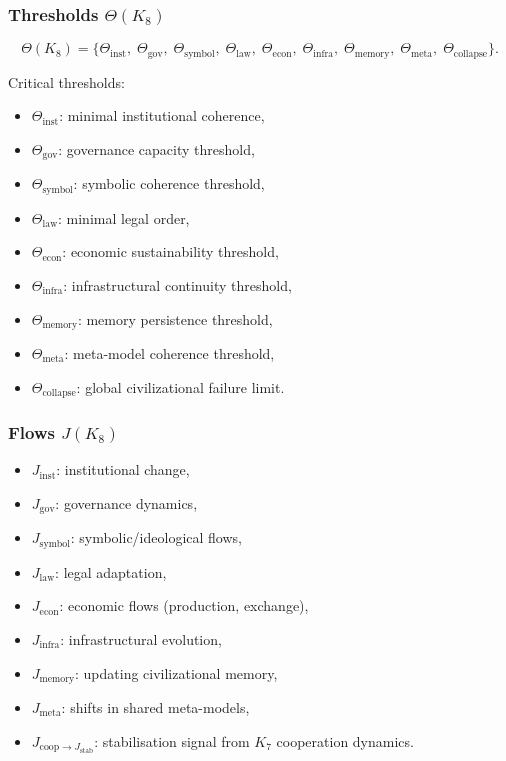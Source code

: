 \subsubsection{Thresholds \texorpdfstring{$\Theta(K_8)$}{\Theta(K_8)}}

\[
\Theta(K_8)=
\{
\Theta_{\mathrm{inst}},\;
\Theta_{\mathrm{gov}},\;
\Theta_{\mathrm{symbol}},\;
\Theta_{\mathrm{law}},\;
\Theta_{\mathrm{econ}},\;
\Theta_{\mathrm{infra}},\;
\Theta_{\mathrm{memory}},\;
\Theta_{\mathrm{meta}},\;
\Theta_{\mathrm{collapse}}
\}.
\]

Critical thresholds:
\begin{itemize}
    \item $\Theta_{\mathrm{inst}}$: minimal institutional coherence,
    \item $\Theta_{\mathrm{gov}}$: governance capacity threshold,
    \item $\Theta_{\mathrm{symbol}}$: symbolic coherence threshold,
    \item $\Theta_{\mathrm{law}}$: minimal legal order,
    \item $\Theta_{\mathrm{econ}}$: economic sustainability threshold,
    \item $\Theta_{\mathrm{infra}}$: infrastructural continuity threshold,
    \item $\Theta_{\mathrm{memory}}$: memory persistence threshold,
    \item $\Theta_{\mathrm{meta}}$: meta-model coherence threshold,
    \item $\Theta_{\mathrm{collapse}}$: global civilizational failure limit.
\end{itemize}

\subsubsection{Flows \texorpdfstring{$J(K_8)$}{J(K_8)}}

\begin{itemize}
    \item $J_{\mathrm{inst}}$: institutional change,
    \item $J_{\mathrm{gov}}$: governance dynamics,
    \item $J_{\mathrm{symbol}}$: symbolic/ideological flows,
    \item $J_{\mathrm{law}}$: legal adaptation,
    \item $J_{\mathrm{econ}}$: economic flows (production, exchange),
    \item $J_{\mathrm{infra}}$: infrastructural evolution,
    \item $J_{\mathrm{memory}}$: updating civilizational memory,
    \item $J_{\mathrm{meta}}$: shifts in shared meta-models,
    \item $J_{\mathrm{coop}\to J_{\mathrm{stab}}}$: stabilisation signal from $K_7$ cooperation dynamics.
\end{itemize}

